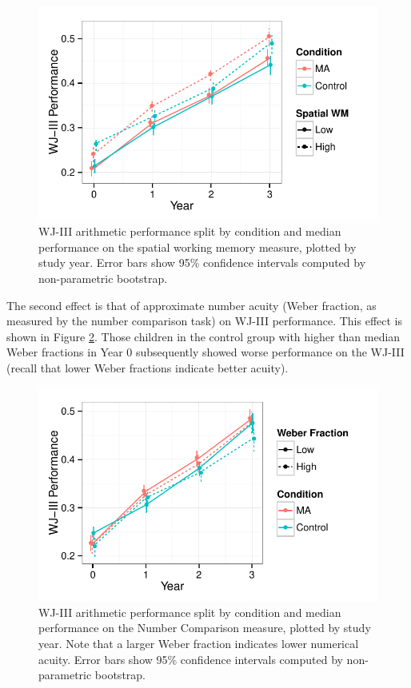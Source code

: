 \documentclass[11pt]{article}
\begin{document}
\begin{figure}[H]
\begin{center}
\includegraphics[width=4.5in]{figures/wj_by_swm.pdf}
\end{center}
\caption{WJ-III arithmetic performance split by condition and median performance on the spatial working memory measure, plotted by study year. Error bars show 95\% confidence intervals computed by non-parametric bootstrap.}
\label{fig:wj3swm}
\end{figure}

The second effect is that of approximate number acuity (Weber fraction, as measured by the number comparison task) on WJ-III performance. This effect is shown in Figure \ref{fig:wj3ans}. Those children in the control group with higher than median Weber fractions in Year 0 subsequently showed worse performance on the WJ-III (recall that lower Weber fractions indicate better acuity). 

\begin{figure}[H]
\begin{center}
\includegraphics[width=4.5in]{figures/wj_by_ans.pdf}
\end{center}
\caption{WJ-III arithmetic performance split by condition and median performance on the Number Comparison measure, plotted by study year. Note that a larger Weber fraction indicates lower numerical acuity. Error bars show 95\% confidence intervals computed by non-parametric bootstrap.}
\label{fig:wj3ans}
\end{figure}
\end{document}

